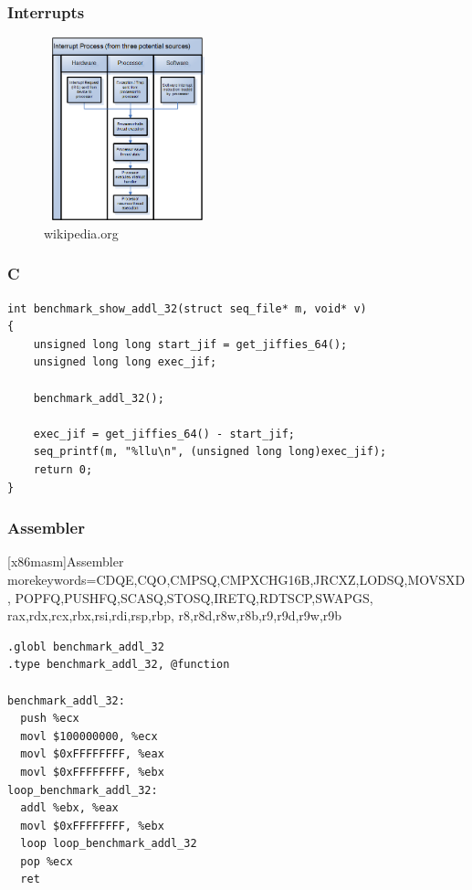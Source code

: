 \documentclass{beamer}
\begin{document}
\begin{frame}
\frametitle{Interrupts}
\begin{figure}
  \includegraphics[width=185px,height=200px]{Interrupt_Process.PNG}
   \caption{wikipedia.org}
\end{figure}	

\end{frame}


\begin{frame}[fragile]
\frametitle{C} 

\begin{lstlisting}
int benchmark_show_addl_32(struct seq_file* m, void* v)
{
    unsigned long long start_jif = get_jiffies_64();
    unsigned long long exec_jif;

    benchmark_addl_32();

    exec_jif = get_jiffies_64() - start_jif;
    seq_printf(m, "%llu\n", (unsigned long long)exec_jif);
    return 0;
}

\end{lstlisting}

\end{frame}





\begin{frame}[fragile]
\frametitle{Assembler} 


   [x86masm]{Assembler} %
   {morekeywords={CDQE,CQO,CMPSQ,CMPXCHG16B,JRCXZ,LODSQ,MOVSXD, %
                  POPFQ,PUSHFQ,SCASQ,STOSQ,IRETQ,RDTSCP,SWAPGS, %
                  rax,rdx,rcx,rbx,rsi,rdi,rsp,rbp, %
                  r8,r8d,r8w,r8b,r9,r9d,r9w,r9b}} %

\lstset{language=[x64]Assembler}

\begin{lstlisting}
.globl benchmark_addl_32
.type benchmark_addl_32, @function

benchmark_addl_32:
  push %ecx
  movl $100000000, %ecx
  movl $0xFFFFFFFF, %eax
  movl $0xFFFFFFFF, %ebx
loop_benchmark_addl_32:
  addl %ebx, %eax
  movl $0xFFFFFFFF, %ebx
  loop loop_benchmark_addl_32
  pop %ecx
  ret
\end{lstlisting}
\end{frame}
\end{document}
